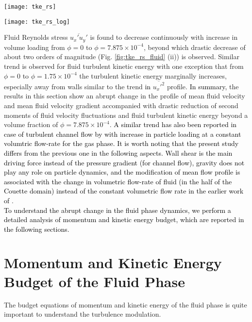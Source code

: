 \documentclass[aip,graphicx]{revtex4-1}
\begin{document}
    \begin{figure*}[h!]
    	{\texttt{[image: tke\_rs]}}
    	\caption*{(i)}
  	{\texttt{[image: tke\_rs\_log]}}
  	\caption*{(ii)}
  	\caption{Effect of particle volume fraction on (a) fluid turbulent kinetic energy and (b) Reynolds stress plotted in (i) in linear scale and (ii) in log-linear scale)}
  	\label{fig:tke_rs_fluid}
    \end{figure*}
 Fluid Reynolds stress $\overline{u_x'u_y'}$ is found to decrease continuously with increase in volume loading from $\phi=0$ to $\phi=7.875\times10^{-4}$, beyond which drastic decrease of about two orders of magnitude (Fig. \ref{fig:tke_rs_fluid} (ii)) is observed. Similar trend is observed for fluid turbulent kinetic energy with one exception that from $\phi=0$ to $\phi=1.75\times10^{-4}$ the turbulent kinetic energy marginally increases, especially away from walls similar to the trend \textcolor{black}{in} $\overline{u_x'^2}$ profile. \textcolor{black}{In summary,} the results in this section show an abrupt change in the profile of mean fluid velocity and mean fluid velocity gradient accompanied with drastic reduction of second moments of fluid velocity fluctuations and fluid turbulent kinetic energy beyond a volume fraction of $\phi=7.875\times10^{-4}$. \textcolor{black}{A similar trend has also been reported in case of turbulent channel flow by \citet{muramulla2020disruption} with increase in particle loading at a constant volumtric flow-rate for the gas phase. It is worth noting that the present study differs from the previous one in the following aspects. Wall shear is the main driving force instead of the pressure gradient (for channel flow), gravity does not play any role on particle dynamics, and the modification of mean flow profile is associated with the change in volumetric flow-rate of fluid (in the half of the Couette domain) instead of the constant volumetric flow rate in the earlier work of \citet{muramulla2020disruption}}.
 \\ \textcolor{black}{To understand the abrupt change in the fluid phase dynamics, we perform a detailed analysis of momentum and kinetic energy budget, which are reported in the following sections.} 
\section{Momentum and Kinetic Energy Budget of the Fluid Phase}
The budget equations of momentum and kinetic energy of the fluid phase is quite important to understand the turbulence modulation.
\end{document}
